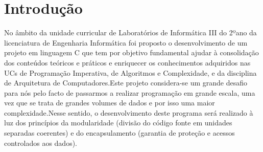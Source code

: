 \chapter{Introdução}

No âmbito da unidade curricular de Laboratórios de Informática III do 2ºano da licenciatura de Engenharia Informática foi proposto o desenvolvimento de um projeto em linguagem C que tem por objetivo fundamental ajudar à consolidação dos conteúdos teóricos e práticos e enriquecer os conhecimentos adquiridos nas UCs de Programação Imperativa, de Algoritmos e Complexidade, e da disciplina de Arquitetura de Computadores.Este projeto considera-se um grande desafio para nós pelo facto de passarmos a realizar programação em grande escala, uma vez que se trata de grandes volumes de dados e por isso uma maior complexidade.Nesse sentido, o desenvolvimento deste programa será realizado à luz dos princípios da modularidade (divisão do código fonte em unidades separadas coerentes) e do encapsulamento (garantia de proteção e acessos controlados aos dados). 
